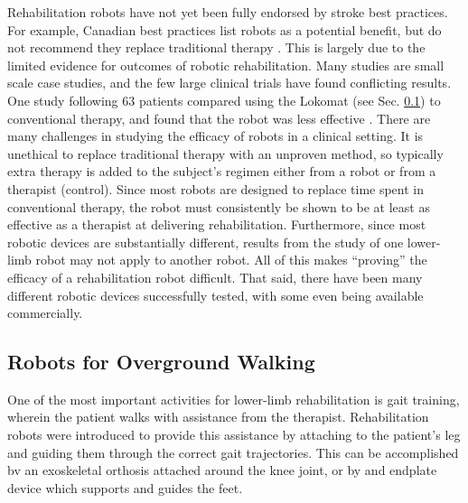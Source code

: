 \documentclass[12pt]{report}
\begin{document}
	
	Rehabilitation robots have not yet been fully endorsed by stroke best practices. For example, Canadian best practices list robots as a potential benefit, but do not recommend they replace traditional therapy \cite{Hebert2016}. This is largely due to the limited evidence for outcomes of robotic rehabilitation. Many studies are small scale case studies, and the 
few large clinical trials have found conflicting results. One study following 63 patients compared using the Lokomat (see Sec. \ref{Sec:Overground}) to conventional therapy, and found that the robot was less effective \cite{Hidler2008}. There are many challenges in studying the efficacy of robots in a clinical setting. It is unethical to replace traditional therapy with an unproven method, so typically extra therapy is added to the subject's regimen either from a robot or from a therapist (control). Since most robots are designed to replace time spent in conventional therapy, the robot must consistently be shown to be at least as effective as a therapist at delivering rehabilitation. Furthermore, since most robotic devices are substantially different, results from the study of one lower-limb robot may not apply to another robot. All of this makes ``proving'' the efficacy of a rehabilitation robot difficult. That said, there have been many different robotic devices successfully tested, with some even being available commercially. 
	
	
	\subsection{Robots for Overground Walking} \label{Sec:Overground}

	One of the most important activities for lower-limb rehabilitation is gait training, wherein the patient walks with assistance from the therapist. Rehabilitation robots were introduced to provide this assistance by attaching to the patient's leg and guiding them through the correct gait trajectories. This can be accomplished bv an exoskeletal orthosis attached around the knee joint, or by and endplate device which supports and guides the feet. 
	
	
	
	
\end{document}

